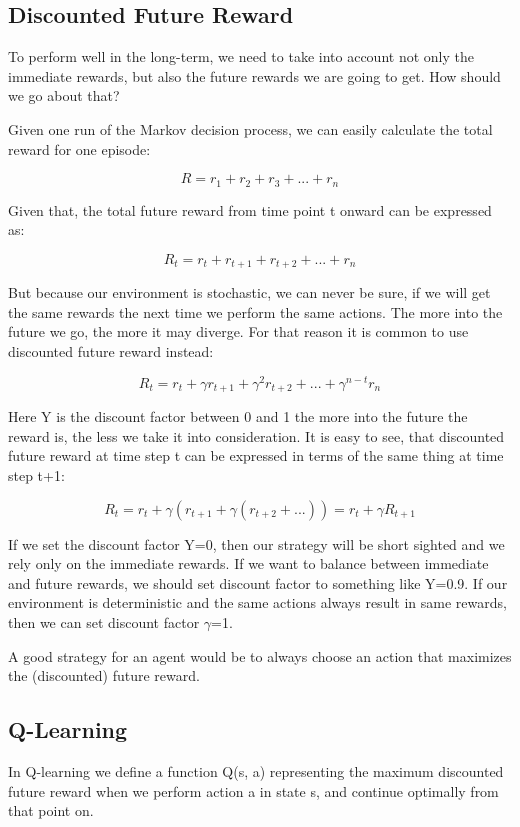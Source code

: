 \documentclass[a4paper,12pt]{report}
\begin{document}
			\subsection{Discounted Future Reward}
				To perform well in the long-term, we need to take into account not only the immediate rewards, but also the future rewards we are going to get. How should we go about that?

				Given one run of the Markov decision process, we can easily calculate the total reward for one episode:

				\[ R = r_1 + r_2 + r_3 + ... + r_n \]

				Given that, the total future reward from time point t onward can be expressed as:

				\[ R_t = r_t + r_{t+1} + r_{t+2} + ... + r_n \]

				But because our environment is stochastic, we can never be sure, if we will get the same rewards the next time we perform the same actions. The more into the future we go, the more it may diverge. For that reason it is common to use discounted future reward instead:

				\[ R_t = r_t + {\gamma}r_{t+1} + {\gamma}^2r_{t+2} + ... + {\gamma}^{n-t}r_n\]

				Here Y is the discount factor between 0 and 1 the more into the future the reward is, the less we take it into consideration. It is easy to see, that discounted future reward at time step t can be expressed in terms of the same thing at time step t+1:

				\[ R_t = r_t + \gamma(r_{t+1} + \gamma(r_{t+2} + ...)) = r_t + {\gamma}R_{t+1}\]

				If we set the discount factor Y=0, then our strategy will be short sighted and we rely only on the immediate rewards. If we want to balance between immediate and future rewards, we should set discount factor to something like Y=0.9. If our environment is deterministic and the same actions always result in same rewards, then we can set discount factor $\gamma$=1.

				A good strategy for an agent would be to always choose an action that maximizes the (discounted) future reward.
			\subsection{Q-Learning}
				In Q-learning we define a function Q(s, a) representing the maximum discounted future reward when we perform action a in state s, and continue optimally from that point on.
\end{document}
